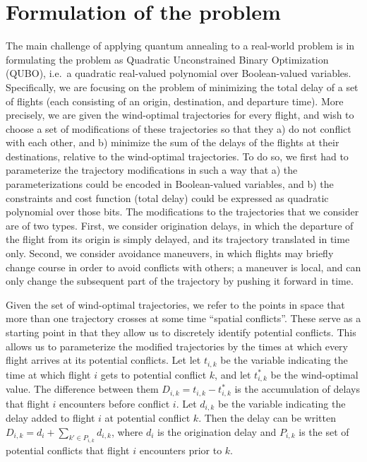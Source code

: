 \section*{Formulation of the problem}\label{sec:approach}

The main challenge of applying quantum annealing to a real-world problem is in formulating the problem as Quadratic Unconstrained Binary Optimization (QUBO), i.e.\ a quadratic real-valued polynomial over Boolean-valued variables.
%
Specifically, we are focusing on the problem of minimizing the total delay of a set of flights (each consisting of an origin, destination, and departure time).
More precisely, we are given the wind-optimal trajectories for every flight, and wish to choose a set of modifications of these trajectories so that they a) do not conflict with each other, and b) minimize the sum of the delays of the flights at their destinations, relative to the wind-optimal trajectories.
%
To do so, we first had to parameterize the trajectory modifications in such a way that a) the parameterizations could be encoded in Boolean-valued variables, and b) the constraints and cost function (total delay) could be expressed as quadratic polynomial over those bits.
The modifications to the trajectories that we consider are of two types. 
First, we consider origination delays, in which the departure of the flight from its origin is simply delayed, and its trajectory translated in time only. 
Second, we consider avoidance maneuvers, in which flights may briefly change course in order to avoid conflicts with others;
a maneuver is local, and can only change the subsequent part of the trajectory by pushing it forward in time.

Given the set of wind-optimal trajectories, we refer to the points in space that more than one trajectory crosses at some time ``spatial conflicts''.
These serve as a starting point in that they allow us to discretely identify potential conflicts.
This allows us to parameterize the modified trajectories by the times at which every flight arrives at its potential conflicts.
Let let $t_{i,k}$ be the variable indicating the time at which flight $i$ gets to potential conflict $k$, and let $t_{i,k}^*$ be the wind-optimal value.
The difference between them $D_{i,k} = t_{i,k} - t^*_{i,k}$ is the accumulation of delays that flight $i$ encounters before conflict $i$.
Let $d_{i,k}$ be the variable indicating the delay added to flight $i$ at potential conflict $k$.
Then the delay can be written $D_{i,k} = d_i + \sum_{k' \in P_{i,k}} d_{i,k}$, where $d_i$ is the origination delay and $P_{i,k}$ is the set of potential conflicts that flight $i$ encounters prior to $k$.

